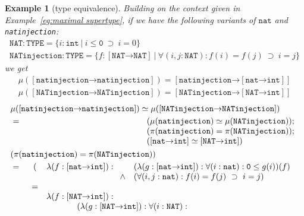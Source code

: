 \documentclass [12pt,twoside]{cslreport}
\newcommand{\thmbox}
   {{\ \hfill\hbox{%
      \vrule width1.0ex height1.0ex
   }\parfillskip 0pt }}
\newtheorem{example}[thm]{Example}
\newcommand{\aro}{\mathord\rightarrow} %
\newcommand{\funtype}[2]{[#1 \aro #2]}
\newcommand{\tttype}{\mathtt{TYPE}}
\newcommand{\ttint}{\mathtt{int}}
\newcommand{\ttnat}{\mathtt{nat}}
\newcommand{\vbar}{\ |\ }
\newenvironment{Eg}[1]{\begin{example}[#1]\label{eg:#1}\em }{\thmbox\end{example}}
\begin{document}
\begin{Eg}{type equivalence}  Building on the context given in
Example~\ref{eg:maximal supertype}, 
if we have the following variants of $\ttnat{}$ and
\texttt{natinjection}:
$$
\begin{array}{l}
\mathtt{NAT} :  \tttype = \{ i : \ttint \vbar  i \leq \mathtt{0}\ 
\supset\ i = 0\}\\
\mathtt{NATinjection} : \tttype = \{ f : \funtype{ \mathtt{NAT}}{
\mathtt{NAT}} \vbar 
\forall (i, j: \mathtt{NAT}): f(i) = f(j)\ \supset\ i = j \}
\end{array}$$
we get
\begin{eqnarray*}
\mu(\funtype{ \mathtt{natinjection}}{ \mathtt{natinjection}}) =
 \funtype{ \mathtt{natinjection}}{\funtype{\ttnat}{\ttint}}\\
%
\mu(\funtype{ \mathtt{NATinjection}}{ \mathtt{NATinjection}}) =
 \funtype{ \mathtt{NATinjection}}{\funtype{ \mathtt{NAT}}{ \ttint}}
\end{eqnarray*}
\begin{eqnarray*}
\lefteqn{\mu(\funtype{ \mathtt{natinjection}}{ \mathtt{natinjection}})
\simeq \mu(\funtype{ \mathtt{NATinjection}}{ \mathtt{NATinjection}})}\\
& = &  \begin{array}[t]{l}
       (\mu( \mathtt{natinjection}) \simeq \mu( \mathtt{NATinjection}));\\
       (\pi( \mathtt{natinjection}) = \pi( \mathtt{NATinjection}));\\
       (\funtype{\ttnat}{\ttint} \simeq \funtype{ \mathtt{NAT}}{ \mathtt{int}})     
       \end{array}\\
 \lefteqn{(\pi( \mathtt{natinjection}) = \pi( \mathtt{NATinjection}))}\\
& = & \begin{array}[t]{cl}
(&      \lambda (f : \funtype{\ttnat}{\ttint}) :
\begin{array}[t]{cl}
& (\lambda (g : \funtype{\ttnat}{\ttint}) : \forall (i: \ttnat):
\mathtt{0}\leq  g(i))(f) \\
\wedge & (\forall (i, j: \ttnat): f(i) = f(j) \ \supset\  i = j)
 \end{array}\\
 =  \\&  \lambda (f : \funtype{ \mathtt{NAT}}{\ttint}) :\\&\hspace*{.3in}
\begin{array}[t]{cl}
& (\lambda (g : \funtype{ \mathtt{NAT}}{\ttint}) : \forall (i: \mathtt{NAT}):

\end{array}
\end{array}
\end{eqnarray*}
\end{Eg}
\end{document}
